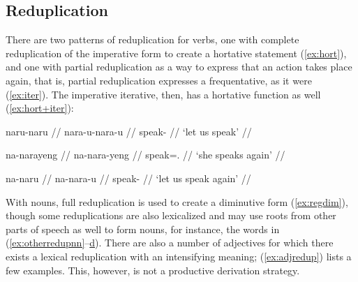 % 
% 

\xe

\subsection{Reduplication}

There are two patterns of reduplication for verbs, one with complete 
reduplication of the imperative form to create a hortative statement 
(\ref{ex:hort}), and one with partial reduplication as a way to express that an 
action takes place again, that is, partial reduplication expresses a 
frequentative, as it were (\ref{ex:iter}). The imperative iterative, then, has a 
hortative function as well (\ref{ex:hort+iter}):

\pex
\a\label{ex:hort}\begingl%
	\gla naru-naru //
	\glb nara-u-nara-u //
	\glc speak-\Imp{}\til\Hort{} //
	\glft `let us speak' //
\endgl

\a\label{ex:iter}\begingl
	\gla na-narayeng //
	\glb na-nara-yeng //
	\glc \Iter{}\til{}speak=\TsgF{}.\Aarg{} //
	\glft `she speaks again' //
\endgl

\a\label{ex:hort+iter}\begingl
	\gla na-naru //
	\glb na-nara-u //
	\glc \Iter{}\til{}speak-\Imp{} //
	\glft `let us speak again' //
\endgl

\xe

With nouns, full reduplication is used to create a diminutive 
form (\ref{ex:regdim}), though some reduplications are also lexicalized and 
may use roots from other parts of speech as well to form nouns, for instance, 
the words in (\ref{ex:otherredupnn}--\hyperref[ex:otherredupvb]{d}). There are 
also a number of adjectives for which there exists a lexical reduplication with 
an intensifying meaning; (\ref{ex:adjredup}) lists a few examples. This, 
however, is not a productive derivation strategy.

